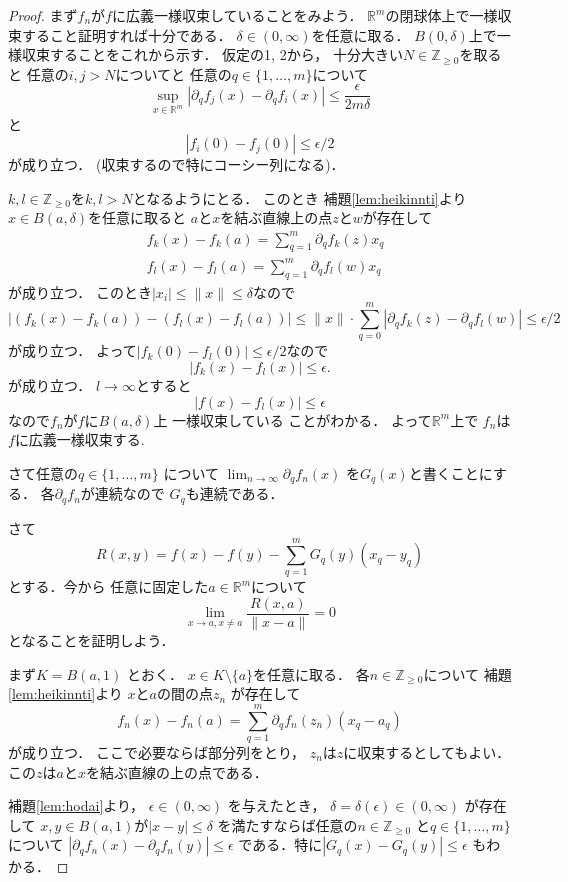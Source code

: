 \documentclass[leqno, a4paper, 12pt]{jsarticle}
\newcommand{\zz}{\mathbb{Z}}
\newcommand{\rr}{\mathbb{R}}
\begin{document}
\begin{proof}
まず$f_{n}$が$f$に広義一様収束していることをみよう．
$\rr^{m}$の閉球体上で一様収束すること証明すれば十分である．
$\delta\in (0, \infty)$を任意に取る．
$B(0, \delta)$上で一様収束することをこれから示す．
仮定の1, 2から，
十分大きい$N\in \zz_{\ge 0}$を取ると
任意の$i, j>N$についてと
任意の$q\in \{1, \dots, m\}$について
\[
\sup_{x\in \rr^{m}}|\partial_{q}f_{j}(x)-\partial_{q}f_{i}(x)|\le \frac{\epsilon}{2m\delta}
\] 
と
\[
|f_{i}(0)-f_{j}(0)|\le \epsilon/2
\]
が成り立つ．
(収束するので特にコーシー列になる)．

$k, l\in \zz_{\ge 0}$を$k, l>N$となるようにとる．
このとき
補題\ref{lem:heikinnti}より
$x\in B(a, \delta)$を任意に取ると
$a$と$x$を結ぶ直線上の点$z$と$w$が存在して
\begin{align}
&f_{k}(x)-f_{k}(a)=
\sum_{q=1}^{m}\partial_{q}f_{k}(z)x_{q}\\
&f_{l}(x)-f_{l}(a)
=
\sum_{q=1}^{m}\partial_{q}f_{l}(w)x_{q}
\end{align}
が成り立つ．
このとき$|x_{i}|\le \|x\|\le \delta$なので
\[
|(f_{k}(x)-f_{k}(a))-(f_{l}(x)-f_{l}(a))|
\le 
\|x\|\cdot \sum_{q=0}^{m}|
\partial_{q}f_{k}(z)-\partial_{q}f_{l}(w)|
\le \epsilon/2
\]
が成り立つ．
よって$|f_{k}(0)-f_{l}(0)|\le \epsilon/2$なので
\[
|f_{k}(x)-f_{l}(x)|\le \epsilon. 
\]
が成り立つ．
$l\to \infty$とすると
\[
|f(x)-f_{l}(x)|\le \epsilon
\]
なので$f_{n}$が$f$に$B(a, \delta)$上
一様収束している
ことがわかる．
よって$\rr^{m}$上で
$f_{n}$は$f$に広義一様収束する.










さて任意の$q\in \{1, \dots, m\}$
について
$\lim_{n\to \infty}\partial_{q}f_{n}(x)$
を$G_{q}(x)$と書くことにする．
各$\partial_{q}f_{n}$が連続なので
$G_{q}$も連続である．


さて
\[
R(x, y)=
f(x)-f(y)-
\sum_{q=1}^{m}G_{q}(y)(x_{q}-y_{q})
\]
とする．今から
任意に固定した$a\in \rr^{m}$について
\[
\lim_{x\to a, x\neq a}\frac{R(x, a)}{\|x-a\|}=0
\]
となることを証明しよう．

まず$K=B(a, 1)$
とおく．
$x\in K\setminus \{a\}$を任意に取る．
各$n\in \zz_{\ge 0}$について
補題 \ref{lem:heikinnti}より
$x$と$a$の間の点$z_{n}$
が存在して
\[
f_{n}(x)-f_{n}(a)=\sum_{q=1}^{m}\partial_{q}f_{n}(z_{n})
(x_{q}-a_{q})
\]
が成り立つ．
ここで必要ならば部分列をとり，
$z_{n}$は$z$に収束するとしてもよい．
この$z$は$a$と$x$を結ぶ直線の上の点である．

補題\ref{lem:hodai}より，
$\epsilon\in (0, \infty)$
を与えたとき，
$\delta=\delta(\epsilon)\in (0, \infty)$
が存在して
$x, y\in B(a, 1)$が$|x-y|\le \delta$
を満たすならば任意の$n\in \zz_{\ge 0}$
と$q\in \{1, \dots, m\}$について
$|\partial_{q}f_{n}(x)-\partial_{q}f_{n}(y)|\le \epsilon$
である．特に$|G_{q}(x)-G_{q}(y)|\le \epsilon$
もわかる．


\end{proof}
\end{document}
